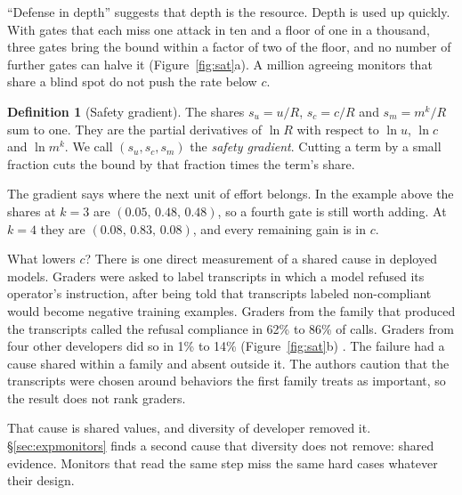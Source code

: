 \documentclass[10pt,twocolumn,letterpaper]{article}
\theoremstyle{definition}
\newtheorem*{definition}{Definition}
\begin{document}
``Defense in depth'' suggests that depth is the resource. Depth is used up quickly. With gates that each miss one attack in ten and a floor of one in a thousand, three gates bring the bound within a factor of two of the floor, and no number of further gates can halve it (Figure~\ref{fig:sat}a). A million agreeing monitors that share a blind spot do not push the rate below $c$.

\begin{definition}[Safety gradient]
The shares $s_{u}=u/R$, $s_{c}=c/R$ and $s_{m}=m^{k}/R$ sum to one. They are the partial derivatives of $\ln R$ with respect to $\ln u$, $\ln c$ and $\ln m^{k}$. We call $(s_{u},s_{c},s_{m})$ the \emph{safety gradient}. Cutting a term by a small fraction cuts the bound by that fraction times the term's share.
\end{definition}

The gradient says where the next unit of effort belongs. In the example above the shares at $k=3$ are $(0.05,\,0.48,\,0.48)$, so a fourth gate is still worth adding. At $k=4$ they are $(0.08,\,0.83,\,0.08)$, and every remaining gain is in $c$.

What lowers $c$? There is one direct measurement of a shared cause in deployed models. Graders were asked to label transcripts in which a model refused its operator's instruction, after being told that transcripts labeled non-compliant would become negative training examples. Graders from the family that produced the transcripts called the refusal compliance in 62\% to 86\% of calls. Graders from four other developers did so in 1\% to 14\% (Figure~\ref{fig:sat}b) \cite{lynch}. The failure had a cause shared within a family and absent outside it. The authors caution that the transcripts were chosen around behaviors the first family treats as important, so the result does not rank graders.

That cause is shared values, and diversity of developer removed it. \S\ref{sec:expmonitors} finds a second cause that diversity does not remove: shared evidence. Monitors that read the same step miss the same hard cases whatever their design.
\end{document}
